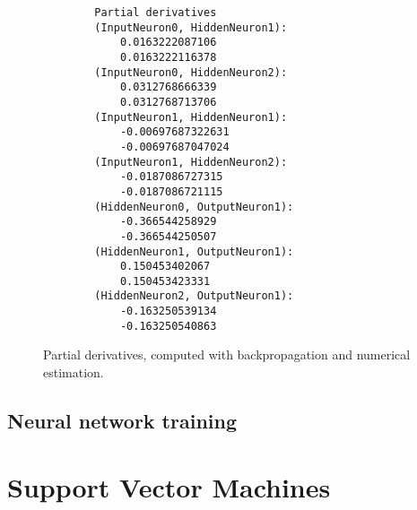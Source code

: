 \documentclass[a4paper]{article}
\begin{document}
\begin{figure}[H]
	\begin{lstlisting}
        Partial derivatives
        (InputNeuron0, HiddenNeuron1):
        	0.0163222087106
        	0.0163222116378
        (InputNeuron0, HiddenNeuron2):
        	0.0312768666339
        	0.0312768713706
        (InputNeuron1, HiddenNeuron1):
        	-0.00697687322631
        	-0.00697687047024
        (InputNeuron1, HiddenNeuron2):
        	-0.0187086727315
        	-0.0187086721115
        (HiddenNeuron0, OutputNeuron1):
        	-0.366544258929
        	-0.366544250507
        (HiddenNeuron1, OutputNeuron1):
        	0.150453402067
        	0.150453423331
        (HiddenNeuron2, OutputNeuron1):
        	-0.163250539134
        	-0.163250540863
        \end{lstlisting}
	\caption{Partial derivatives, computed with backpropagation and numerical estimation.}
	\label{fig:partial_derivatives}
\end{figure}

\subsection{Neural network training}

\section{Support Vector Machines}
\end{document}
